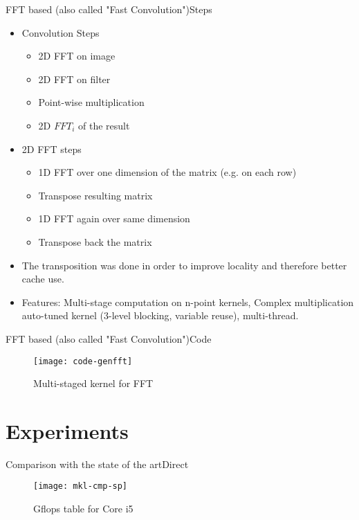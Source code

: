 \documentclass{beamer}
\begin{document}
\begin{frame}{FFT based (also called "Fast Convolution")}{Steps}
  \begin{itemize}
        \item {
           Convolution Steps
          }
      \begin{itemize}
          \item {
           2D FFT on image
          }
          \item {
           2D FFT on filter
          }
          \item {
           Point-wise multiplication
          }
          \item {
           2D $FFT_i$ of the result
          }
      \end{itemize}
      \item {
           2D FFT steps
          }
      \begin{itemize}
          \item {
           1D FFT over one dimension of the matrix (e.g. on each row)
          }
          \item {
           Transpose resulting matrix
          }
          \item {
           1D FFT again over same dimension
          }
          \item {
           Transpose back the matrix
          }
      \end{itemize}
       \item {
            The transposition was done in order to improve locality and therefore better cache use.
         }
          \item {
            Features: Multi-stage computation on n-point kernels, Complex multiplication auto-tuned kernel (3-level blocking, variable reuse),  multi-thread.
         }
  \end{itemize}
\end{frame}

\begin{frame}{FFT based (also called "Fast Convolution")}{Code}
\begin{figure}[ht] \label{fig1} 
\texttt{[image: code-genfft]}
 \caption{Multi-staged kernel for FFT} 
\end{figure}

\end{frame}

\section{Experiments}
\begin{frame}{Comparison with the state of the art}{Direct}
\begin{figure}[ht] \label{fig1} 
\texttt{[image: mkl-cmp-sp]}
 \caption{Gflops table for Core i5} 
\end{figure}
\end{frame}
\end{document}
